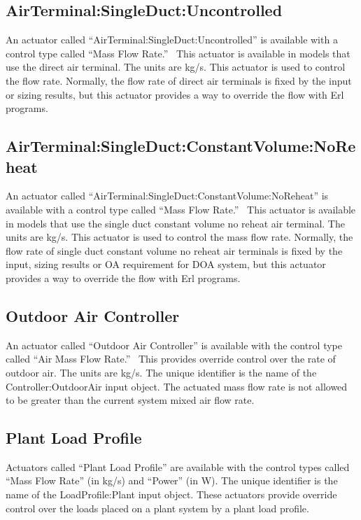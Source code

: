 \subsection{AirTerminal:SingleDuct:Uncontrolled}\label{airterminalsingleductuncontrolled}

An actuator called ``AirTerminal:SingleDuct:Uncontrolled'' is available with a control type called ``Mass Flow Rate.''~ This actuator is available in models that use the direct air terminal. The units are kg/s. This actuator is used to control the flow rate. Normally, the flow rate of direct air terminals is fixed by the input or sizing results, but this actuator provides a way to override the flow with Erl programs.

\subsection{AirTerminal:SingleDuct:ConstantVolume:NoReheat}\label{airTerminalsingleductconstantvolumenoreheat}

An actuator called ``AirTerminal:SingleDuct:ConstantVolume:NoReheat'' is available with a control type called ``Mass Flow Rate.''~ This actuator is available in models that use the single duct constant volume no reheat air terminal. The units are kg/s. This actuator is used to control the mass flow rate. Normally, the flow rate of single duct constant volume no reheat air terminals is fixed by the input, sizing results or OA requirement for DOA system, but this actuator provides a way to override the flow with Erl programs.

\subsection{Outdoor Air Controller}\label{outdoor-air-controller}

An actuator called ``Outdoor Air Controller'' is available with the control type called ``Air Mass Flow Rate.'' ~This provides override control over the rate of outdoor air. The units are kg/s. The unique identifier is the name of the Controller:OutdoorAir input object. The actuated mass flow rate is not allowed to be greater than the current system mixed air flow rate.

\subsection{Plant Load Profile}\label{plant-load-profile}

Actuators called ``Plant Load Profile'' are available with the control types called ``Mass Flow Rate'' (in kg/s) and ``Power'' (in W). The unique identifier is the name of the LoadProfile:Plant input object. These actuators provide override control over the loads placed on a plant system by a plant load profile.

